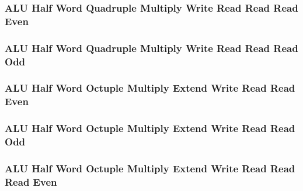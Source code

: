 \subsubsection[{\small ALU Half Word Quadruple Multiply Write Read Read Read Even}]{ALU Half Word Quadruple Multiply Write Read Read Read Even} \label{sec:format-ALU-HQMWRRRE}



\subsubsection[{\small ALU Half Word Quadruple Multiply Write Read Read Read Odd}]{ALU Half Word Quadruple Multiply Write Read Read Read Odd} \label{sec:format-ALU-HQMWRRRO}



\subsubsection[{\small ALU Half Word Octuple Multiply Extend Write Read Read Even}]{ALU Half Word Octuple Multiply Extend Write Read Read Even} \label{sec:format-ALU-HOMEWRRE}



\subsubsection[{\small ALU Half Word Octuple Multiply Extend Write Read Read Odd}]{ALU Half Word Octuple Multiply Extend Write Read Read Odd} \label{sec:format-ALU-HOMEWRRO}



\subsubsection[{\small ALU Half Word Octuple Multiply Extend Write Read Read Read Even}]{ALU Half Word Octuple Multiply Extend Write Read Read Read Even} \label{sec:format-ALU-HOMEWRRRE}



